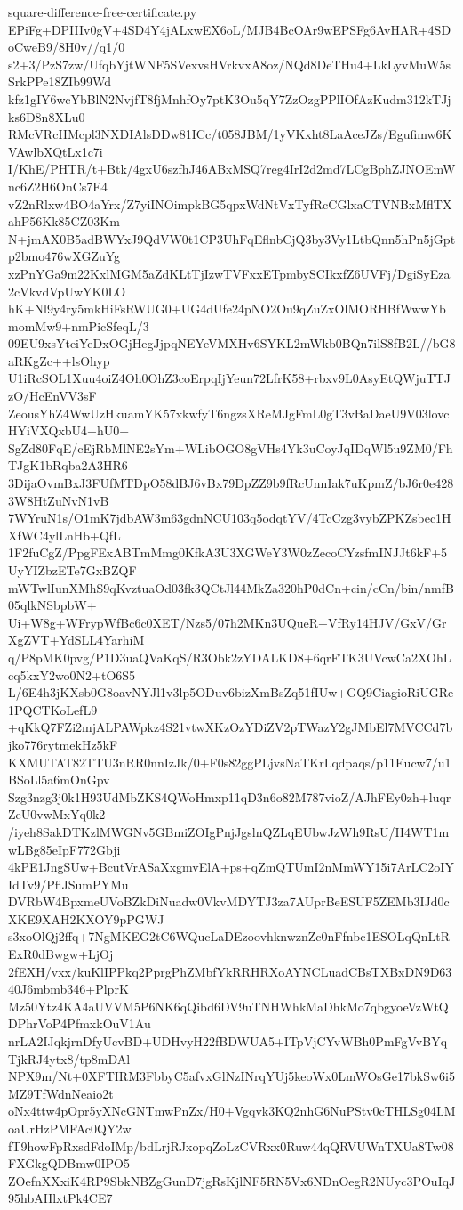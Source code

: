 \documentclass[11pt]{article}
\theoremstyle{definition}
\theoremstyle{remark}
\begin{document}
\begin{filecontents*}[overwrite]{square-difference-free-certificate.py}
EPiFg+DPIIIv0gV+4SD4Y4jALxwEX6oL/MJB4BcOAr9wEPSFg6AvHAR+4SDoCweB9/8H0v//q1/0
s2+3/PzS7zw/UfqbYjtWNF5SVexvsHVrkvxA8oz/NQd8DeTHu4+LkLyvMuW5sSrkPPe18ZIb99Wd
kfz1gIY6wcYbBlN2NvjfT8fjMnhfOy7ptK3Ou5qY7ZzOzgPPlIOfAzKudm312kTJjks6D8n8XLu0
RMcVRcHMcpl3NXDIAlsDDw81ICc/t058JBM/1yVKxht8LaAceJZs/Egufimw6KVAwlbXQtLx1c7i
I/KhE/PHTR/t+Btk/4gxU6szfhJ46ABxMSQ7reg4IrI2d2md7LCgBphZJNOEmWnc6Z2H6OnCs7E4
vZ2nRlxw4BO4aYrx/Z7yiINOimpkBG5qpxWdNtVxTyfRcCGlxaCTVNBxMflTXahP56Kk85CZ03Km
N+jmAX0B5adBWYxJ9QdVW0t1CP3UhFqEflnbCjQ3by3Vy1LtbQnn5hPn5jGptp2bmo476wXGZuYg
xzPnYGa9m22KxlMGM5aZdKLtTjIzwTVFxxETpmbySCIkxfZ6UVFj/DgiSyEza2cVkvdVpUwYK0LO
hK+Nl9y4ry5mkHiFsRWUG0+UG4dUfe24pNO2Ou9qZuZxOlMORHBfWwwYbmomMw9+nmPicSfeqL/3
09EU9xsYteiYeDxOGjHegJjpqNEYeVMXHv6SYKL2mWkb0BQn7ilS8fB2L//bG8aRKgZc++lsOhyp
U1iRcSOL1Xuu4oiZ4Oh0OhZ3coErpqIjYeun72LfrK58+rbxv9L0AsyEtQWjuTTJzO/HcEnVV3sF
ZeousYhZ4WwUzHkuamYK57xkwfyT6ngzsXReMJgFmL0gT3vBaDaeU9V03lovcHYiVXQxbU4+hU0+
SgZd80FqE/cEjRbMlNE2sYm+WLibOGO8gVHs4Yk3uCoyJqIDqWl5u9ZM0/FhTJgK1bRqba2A3HR6
3DijaOvmBxJ3FUfMTDpO58dBJ6vBx79DpZZ9b9fRcUnnIak7uKpmZ/bJ6r0e4283W8HtZuNvN1vB
7WYruN1s/O1mK7jdbAW3m63gdnNCU103q5odqtYV/4TcCzg3vybZPKZsbec1HXfWC4ylLnHb+QfL
1F2fuCgZ/PpgFExABTmMmg0KfkA3U3XGWeY3W0zZecoCYzsfmINJJt6kF+5UyYIZbzETe7GxBZQF
mWTwlIunXMhS9qKvztuaOd03fk3QCtJl44MkZa320hP0dCn+cin/cCn/bin/nmfB05qlkNSbpbW+
Ui+W8g+WFrypWfBc6c0XET/Nzs5/07h2MKn3UQueR+VfRy14HJV/GxV/GrXgZVT+YdSLL4YarhiM
q/P8pMK0pvg/P1D3uaQVaKqS/R3Obk2zYDALKD8+6qrFTK3UVcwCa2XOhLcq5kxY2wo0N2+tO6S5
L/6E4h3jKXsb0G8oavNYJl1v3lp5ODuv6bizXmBsZq51fIUw+GQ9CiagioRiUGRe1PQCTKoLefL9
+qKkQ7FZi2mjALPAWpkz4S21vtwXKzOzYDiZV2pTWazY2gJMbEl7MVCCd7bjko776rytmekHz5kF
KXMUTAT82TTU3nRR0nnIzJk/0+F0s82ggPLjvsNaTKrLqdpaqs/p11Eucw7/u1BSoLl5a6mOnGpv
Szg3nzg3j0k1H93UdMbZKS4QWoHmxp11qD3n6o82M787vioZ/AJhFEy0zh+luqrZeU0vwMxYq0k2
/iyeh8SakDTKzlMWGNv5GBmiZOIgPnjJgslnQZLqEUbwJzWh9RsU/H4WT1mwLBg85eIpF772Gbji
4kPE1JngSUw+BcutVrASaXxgmvElA+ps+qZmQTUmI2nMmWY15i7ArLC2oIYIdTv9/PfiJSumPYMu
DVRbW4BpxmeUVoBZkDiNuadw0VkvMDYTJ3za7AUprBeESUF5ZEMb3IJd0cXKE9XAH2KXOY9pPGWJ
s3xoOlQj2ffq+7NgMKEG2tC6WQucLaDEzoovhknwznZc0nFfnbc1ESOLqQnLtRExR0dBwgw+LjOj
2fEXH/vxx/kuKlIPPkq2PprgPhZMbfYkRRHRXoAYNCLuadCBsTXBxDN9D6340J6mbmb346+PlprK
Mz50Ytz4KA4aUVVM5P6NK6qQibd6DV9uTNHWhkMaDhkMo7qbgyoeVzWtQDPhrVoP4PfmxkOuV1Au
nrLA2IJqkjrnDfyUcvBD+UDHvyH22fBDWUA5+ITpVjCYvWBh0PmFgVvBYqTjkRJ4ytx8/tp8mDAl
NPX9m/Nt+0XFTIRM3FbbyC5afvxGlNzINrqYUj5keoWx0LmWOsGe17bkSw6i5MZ9TfWdnNeaio2t
oNx4ttw4pOpr5yXNcGNTmwPnZx/H0+Vgqvk3KQ2nhG6NuPStv0cTHLSg04LMoaUrHzPMFAc0QY2w
fT9howFpRxsdFdoIMp/bdLrjRJxopqZoLzCVRxx0Ruw44qQRVUWnTXUa8Tw08FXGkgQDBmw0IPO5
ZOefnXXxiK4RP9SbkNBZgGunD7jgRsKjlNF5RN5Vx6NDnOegR2NUyc3POuIqJ95hbAHlxtPk4CE7

\end{filecontents*}
\end{document}
